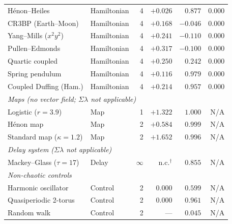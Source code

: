 \documentclass[11pt]{article}
\begin{document}
\begin{table}[ht]
\begin{tabular}{llr r r r}
H\'{e}non--Heiles        & Hamiltonian & 4 & $+0.026$ & $0.877$ & $0.000$ \\
CR3BP (Earth--Moon)      & Hamiltonian & 4 & $+0.168$ & $-0.046$ & $0.000$ \\
Yang--Mills ($x^2y^2$)   & Hamiltonian & 4 & $+0.241$ & $-0.110$ & $0.000$ \\
Pullen--Edmonds          & Hamiltonian & 4 & $+0.317$ & $-0.100$ & $0.000$ \\
Quartic coupled          & Hamiltonian & 4 & $+0.250$ & $0.242$  & $0.000$ \\
Spring pendulum          & Hamiltonian & 4 & $+0.116$ & $0.979$  & $0.000$ \\
Coupled Duffing (Ham.)   & Hamiltonian & 4 & $+0.214$ & $0.957$  & $0.000$ \\
\midrule
\multicolumn{6}{l}{\textit{Maps (no vector field; $\Sigma\lambda$ not applicable)}} \\
Logistic ($r=3.9$)       & Map & 1 & $+1.322$ & $1.000$ & N/A \\
H\'{e}non map            & Map & 2 & $+0.584$ & $0.999$ & N/A \\
Standard map ($\kappa=1.2$) & Map & 2 & $+1.652$ & $0.996$ & N/A \\
\midrule
\multicolumn{6}{l}{\textit{Delay system ($\Sigma\lambda$ not applicable)}} \\
Mackey--Glass ($\tau=17$) & Delay & $\infty$ & n.c.$^{\dagger}$ & $0.855$ & N/A \\
\midrule
\multicolumn{6}{l}{\textit{Non-chaotic controls}} \\
Harmonic oscillator      & Control & 2 & $0.000$ & $0.599$ & N/A \\
Quasiperiodic 2-torus    & Control & 2 & $0.000$ & $0.961$ & N/A \\
Random walk              & Control & 2 & ---      & $0.045$ & N/A \\
\bottomrule
\end{tabular}
\end{table}
\end{document}
